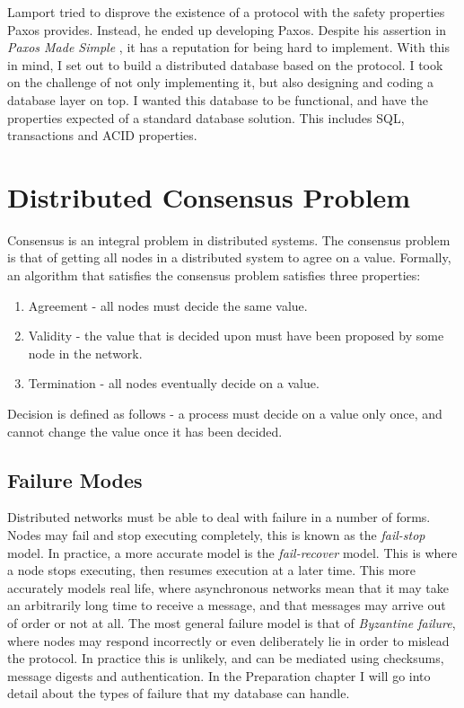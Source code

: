\documentclass[12pt,twoside,notitlepage]{report}
\begin{document}
Lamport tried to disprove the existence of a protocol with the safety properties Paxos provides.
Instead, he ended up developing Paxos. Despite his assertion in \emph{Paxos Made Simple}
\cite{lamport01}, it has a reputation for being hard to implement.  With this in mind, I set out
to build a distributed database based on the protocol.  I took on the challenge of not only
implementing it, but also designing and coding a database layer on top. I wanted this database to
be functional, and have the properties expected of a standard database solution. This includes
SQL, transactions and ACID properties.

\section{Distributed Consensus Problem}

Consensus is an integral problem in distributed systems. The consensus problem is that of getting
all nodes in a distributed system to agree on a value. Formally, an algorithm that satisfies the
consensus problem satisfies three properties:

\begin{enumerate}
\item Agreement - all nodes must decide the same value.
\item Validity - the value that is decided upon must have been proposed by some node in the
	network.
\item Termination - all nodes eventually decide on a value.
\end{enumerate}

Decision is defined as follows - a process must decide on a value only once, and cannot change the
value once it has been decided.

\subsection*{Failure Modes}

Distributed networks must be able to deal with failure in a number of forms. Nodes may fail and
stop executing completely, this is known as the \emph{fail-stop} model. In practice, a more accurate
model is the \emph{fail-recover} model. This is where a node stops executing, then resumes execution
at a later time. This more accurately models real life, where asynchronous networks mean that it
may take an arbitrarily long time to receive a message, and that messages may arrive out of order
or not at all. The most general failure model is that of \emph{Byzantine failure}, where nodes may
respond incorrectly or even deliberately lie in order to mislead the protocol. In practice this is
unlikely, and can be mediated using checksums, message digests and authentication. In the
Preparation chapter I will go into detail about the types of failure that my database can handle.
\end{document}
